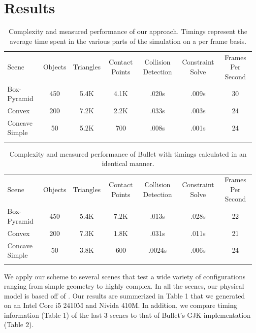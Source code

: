 \documentclass[9pt,twocolumn]{article}
\begin{document}
\section{Results}

\begin{table}
\centering
\begin{tabular}{!{\vrule width 2pt}l!{\vrule width 2pt}c|c | c|c | c | c!{\vrule width 2pt}} 
	Scene & Objects & Triangles &  Contact Points & Collision Detection & Constraint Solve & Frames Per Second\\ 
	Box-Pyramid & 450 & 5.4K &  4.1K & .020s & .009s & 30\\ \hline
	Convex & 200 & 7.2K &  2.2K & .033s & .003s & 24\\ \hline
	Concave Simple & 50 & 5.2K &  700 & .008s & .001s & 24\\ \hline {}
\end{tabular}
\centering
\caption{Complexity and measured performance of our approach. Timings represent the average time spent in the various parts of the simulation on a per frame basis.}
\label{table1}
\end{table}

\begin{table}
\centering
\begin{tabular}{!{\vrule width 2pt}l!{\vrule width 2pt}c|c | c|c | c | c!{\vrule width 2pt}} 
	Scene & Objects & Triangles &  Contact Points & Collision Detection & Constraint Solve & Frames Per Second\\ 
	Box-Pyramid & 450 & 5.4K &  7.2K & .013s & .028s & 22\\ \hline
	Convex & 200 & 7.3K &  1.8K & .031s & .011s & 21\\ \hline
	Concave Simple & 50 & 3.8K &  600 & .0024s & .006s & 24\\ \hline {}
\end{tabular}
\centering
\caption{Complexity and measured performance of Bullet with timings calculated in an identical manner.}
\label{table2}
\end{table}

We apply our scheme to several scenes that test a wide variety of configurations ranging from simple geometry to highly complex. In all the scenes, our physical model is based off of \cite{Guendelman}. Our results are summerized in Table 1 that we generated on an Intel Core i5 2410M and Nivida 410M. In addition, we compare timing information (Table 1) of the last 3 scenes to that of Bullet's GJK implementation (Table 2). \newline
\end{document}
